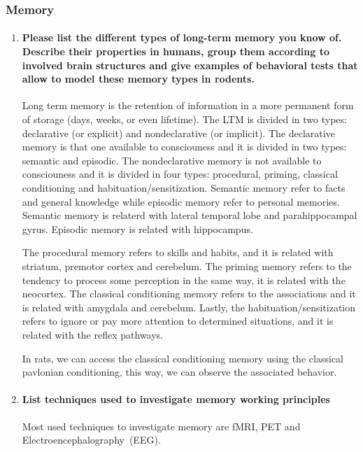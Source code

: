 \documentclass[12pt,article,oneside,a4paper]{memoir}
\begin{document}
\subsubsection{Memory}
\begin{enumerate}
\item \paragraph{Please list the different types of long-term memory you know
of. Describe their properties in humans, group them according to involved brain
structures and give examples of behavioral tests that allow to model these
memory types in rodents.}\label{question:long-term-memory}

Long term memory is the retention of information in a more permanent form of
storage (days, weeks, or even lifetime). The LTM is divided in two types:
declarative (or explicit) and nondeclarative (or implicit).
The declarative memory is that one available to consciouness and it is divided
in two types: semantic and episodic. The nondeclarative memory is not available
to consciouness and it is divided in four types: procedural, priming, classical
conditioning and habituation/sensitization.
Semantic memory refer to facts and general knowledge while episodic memory
refer to personal memories. Semantic memory is relaterd with lateral temporal
lobe and parahippocampal gyrus. Episodic memory is related with hippocampus.

The procedural memory refers to skills and habits, and it is related with
striatum, premotor cortex and cerebelum. The priming memory refers to the
tendency to process some perception in the same way, it is related with the
neocortex. The classical conditioning memory refers to the associations and it
is related with amygdala and cerebelum. Lastly, the habituation/sensitization
refers to ignore or pay more attention to determined situations, and it is
related with the reflex pathways.

In rats, we can access the classical conditioning memory using the classical
pavlonian conditioning, this way, we can observe the associated behavior.

\item \paragraph{List techniques used to investigate memory working principles}
Most used techniques to investigate memory are fMRI, PET and
Electroencephalography~(EEG).


\end{enumerate}
\end{document}
